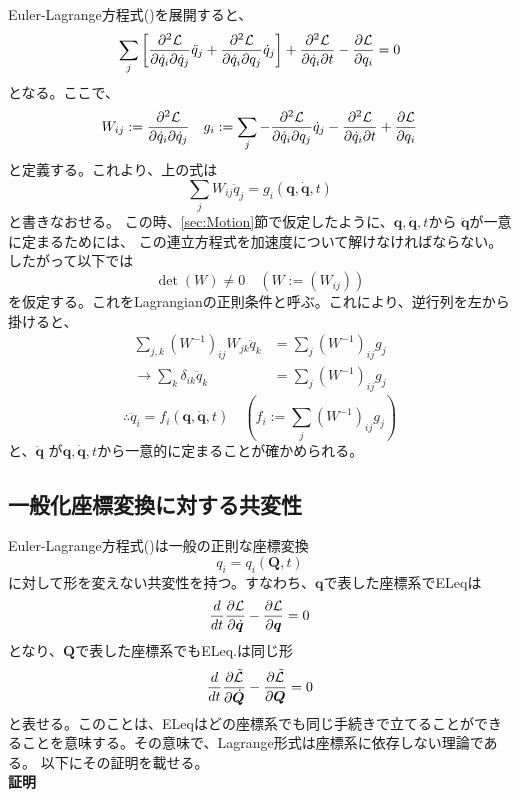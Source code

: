 \documentclass[a4paper,11pt]{ltjsarticle}
\newcommand{\qv}{\bm{q}}
\newcommand{\La}{\mathcal{L}}
\begin{document}
Euler-Lagrange方程式()を展開すると、
\[
\sum_{j}\left[\pdv{\La}{\dot{q}_i}{\dot{q}_j}\ddot{q}_j + \pdv{\La}{\dot{q}_i}{q_j}\dot{q}_j\right]+\pdv{\La}{\dot{q}_i}{t}-\pdv{\La}{q_i}=0
\]
となる。ここで、
\[
W_{ij}:=\pdv{\La}{\dot{q}_i}{\dot{q}_j} \quad g_i:=\sum_{j}-\pdv{\La}{\dot{q}_i}{q_j}\dot{q}_j-\pdv{\La}{\dot{q}_i}{t}+\pdv{\La}{q_i}
\]
と定義する。これより、上の式は
\[
\sum_{j}W_{ij}\ddot{q}_j=g_i(\qv,\dot{\qv},t)
\]
と書きなおせる。
この時、\ref{sec:Motion}節で仮定したように、$\qv , \dot{\qv} ,t $から $\ddot{\qv}$が一意に定まるためには、
この連立方程式を加速度について解けなければならない。したがって以下では
\[
\det(W)\ne 0 \quad (W:=(W_{ij}))
\]
を仮定する。これをLagrangianの正則条件と呼ぶ。これにより、逆行列を左から掛けると、
\begin{align*}
\sum_{j,k}(W^{-1})_{ij}W_{jk}\ddot{q}_k&=\sum_{j}(W^{-1})_{ij}g_j
\\
\rightarrow \sum_{k}\delta_{ik}\ddot{q}_k&=\sum_{j}(W^{-1})_{ij}g_j
\end{align*}
\[\therefore \ddot{q}_i=f_i(\qv,\dot{\qv},t) \quad \left(f_i:=\sum_{j}(W^{-1})_{ij}g_j\right)
\]
と、$\ddot{\qv}$ が$\qv , \dot{\qv} ,t $から一意的に定まることが確かめられる。

\subsection{一般化座標変換に対する共変性}
Euler-Lagrange方程式()は一般の正則な座標変換
\[
q_i=q_i(\bm{Q},t)
\]
に対して形を変えない共変性を持つ。すなわち、$\bm{q}$で表した座標系でELeqは
\[
\frac{d}{dt}\pdv{\La}{\dot{\qv}}-\pdv{\La}{\qv}=0
\]
となり、$\bm{Q}$で表した座標系でもELeq.は同じ形
\[
\frac{d}{dt}\pdv{\tilde{\La}}{\dot{\bm{Q}}}-\pdv{\tilde{\La}}{\bm{Q}}=0
\]
と表せる。このことは、ELeqはどの座標系でも同じ手続きで立てることができることを意味する。その意味で、Lagrange形式は座標系に依存しない理論である。
以下にその証明を載せる。
\\\textbf{証明}
\end{document}
